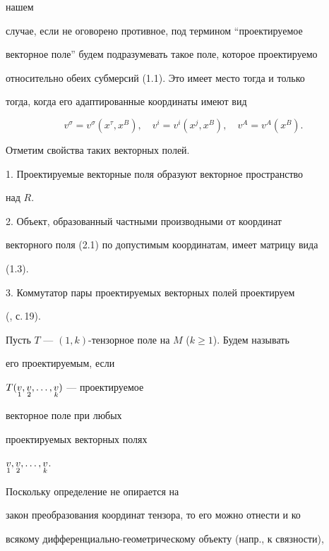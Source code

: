 нашем


случае, если не оговорено противное, под термином ``проектируемое


векторное поле'' будем подразумевать такое поле, которое проектируемо


относительно обеих субмерсий (1.1). Это имеет место тогда и только


тогда, когда его адаптированные координаты имеют вид


\begin{equation}


v^\sigma=v^\sigma(x^\tau,x^B),\quad v^i=v^i(x^j,x^B),\quad


v^A=v^A(x^B).


\end{equation}


Отметим свойства таких векторных полей.





1. Проектируемые векторные поля образуют векторное пространство


над $R$.





2. Объект, образованный частными производными от координат


векторного поля (2.1) по допустимым координатам, имеет матрицу вида


(1.3).





3. Коммутатор пары проектируемых векторных полей проектируем


(\cite{2}, с.\,19).





Пусть $T$ --- $(1,k)$-тензорное поле на $M$ ($k\ge 1$). Будем называть


его проектируемым, если


$T(\underset{1}{v}{},\underset{2}{v}{},\dotsc,\underset{k}{v}{})$ --- проектируемое


векторное поле при любых


проектируемых векторных полях


$\underset{1}{v}{},\underset{2}{v}{},\dotsc,\underset{k}{v}{}$.


Поскольку определение не опирается на


закон преобразования координат тензора, то его можно отнести и ко


всякому дифференциально-геометрическому объекту (напр., к связности),


